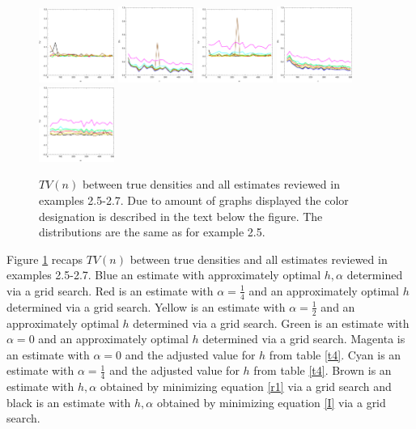 \documentclass[
twoside,
openright,
titlepage,
numbers=noenddot,
headinclude,%
footinclude=true,
dottedtoc, %
ngerman,
american, %
pagesize=pdftex,
]{book}
\begin{document}
\begin{example}
\begin{figure}[H]
			\includegraphics[width=0.22\textwidth]{figures/1DTVexamples/allsn2}
			\includegraphics[width=0.22\textwidth]{figures/1DTVexamples/alln+l1}
			\includegraphics[width=0.22\textwidth]{figures/1DTVexamples/alln+l2}
			\includegraphics[width=0.22\textwidth]{figures/1DTVexamples/allsn+t1}
			\includegraphics[width=0.22\textwidth]{figures/1DTVexamples/allsn+t2}
			\caption{$TV(n)$ between true densities and all estimates reviewed in examples 2.5-2.7. Due to amount of graphs displayed the color designation is described in the text below the figure. The distributions are the same as for example 2.5.}
			\label{fig:72}
		\end{figure}
		Figure \ref{fig:72} recaps $TV(n)$ between true densities and all estimates reviewed in examples 2.5-2.7. Blue an estimate with approximately optimal $h,\alpha$ determined via a grid search. Red is an estimate with $\alpha=\frac{1}{4}$ and an approximately optimal $h$ determined via a grid search. Yellow is an estimate with $\alpha=\frac{1}{2}$ and an approximately optimal $h$ determined via a grid search. Green is an estimate with $\alpha=0$ and an approximately optimal $h$ determined via a grid search. Magenta is an estimate with $\alpha=0$ and the adjusted value for $h$ from table \ref{t4}. Cyan is an estimate with $\alpha=\frac{1}{4}$ and the adjusted value for $h$ from table \ref{t4}. Brown is an estimate with $h,\alpha$ obtained by minimizing equation \eqref{r1} via a grid search and black is an estimate with $h,\alpha$ obtained by minimizing equation \eqref{I} via a grid search.
	\end{example}
\end{document}
